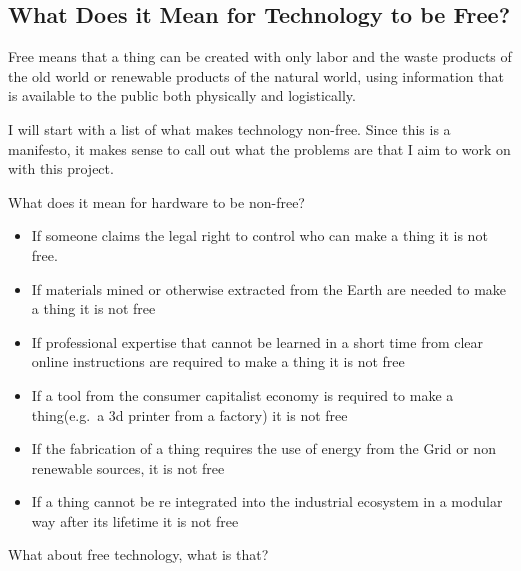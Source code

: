 \subsection{What Does it Mean for Technology to be
Free?}\label{what-does-it-mean-for-technology-to-be-free}

Free means that a thing can be created with only labor and the waste
products of the old world or renewable products of the natural world,
using information that is available to the public both physically and
logistically.

I will start with a list of what makes technology non-free. Since this
is a manifesto, it makes sense to call out what the problems are that I
aim to work on with this project.

What does it mean for hardware to be non-free?

\begin{itemize}
\item
  If someone claims the legal right to control who can make a thing it
  is not free.
\item
  If materials mined or otherwise extracted from the Earth are needed to
  make a thing it is not free
\item
  If professional expertise that cannot be learned in a short time from
  clear online instructions are required to make a thing it is not free
\item
  If a tool from the consumer capitalist economy is required to make a
  thing(e.g.~a 3d printer from a factory) it is not free
\item
  If the fabrication of a thing requires the use of energy from the Grid
  or non renewable sources, it is not free
\item
  If a thing cannot be re integrated into the industrial ecosystem in a
  modular way after its lifetime it is not free
\end{itemize}

What about free technology, what is that?

